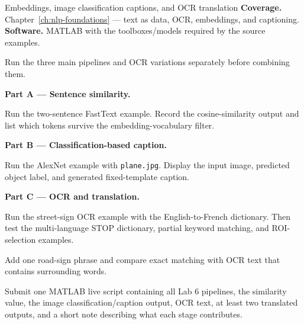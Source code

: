 
\begin{labproject}{Embeddings, image classification captions, and OCR translation}
\textbf{Coverage.} Chapter~\ref{ch:nlp-foundations} --- text as data, OCR, embeddings, and captioning.\\
\textbf{Software.} MATLAB with the toolboxes/models required by the source examples.

\begin{labmode}
Run the three main pipelines and OCR variations separately before combining them.
\end{labmode}

\medskip\noindent\textbf{Part A --- Sentence similarity.}\par
Run the two-sentence FastText example. Record the cosine-similarity output and list which tokens survive the embedding-vocabulary filter.

\medskip\noindent\textbf{Part B --- Classification-based caption.}\par
Run the AlexNet example with \texttt{plane.jpg}. Display the input image, predicted object label, and generated fixed-template caption.

\medskip\noindent\textbf{Part C --- OCR and translation.}\par
Run the street-sign OCR example with the English-to-French dictionary. Then test the multi-language STOP dictionary, partial keyword matching, and ROI-selection examples.

\begin{tryit}
Add one road-sign phrase and compare exact matching with OCR text that contains surrounding words.
\end{tryit}
\end{labproject}

\begin{labdeliverable}
Submit one MATLAB live script containing all Lab 6 pipelines, the similarity value, the image classification/caption output, OCR text, at least two translated outputs, and a short note describing what each stage contributes.
\end{labdeliverable}
